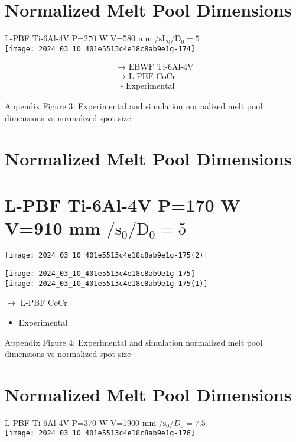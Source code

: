 \documentclass[10pt]{article}
\begin{document}
\section*{Normalized Melt Pool Dimensions}
L-PBF Ti-6Al-4V P=270 W V=580 mm $/ \mathrm{s} \mathrm{L}_{0} / \mathrm{D}_{0}=5$\\
\texttt{[image: 2024\_03\_10\_401e5513c4e18c8ab9e1g-174]}

$$
\begin{aligned}
& \longrightarrow \text { EBWF Ti-6Al-4V } \\
& \longrightarrow \text { L-PBF CoCr } \\
& \text { - Experimental }
\end{aligned}
$$

Appendix Figure 3: Experimental and simulation normalized melt pool dimensions vs normalized spot size

\section*{Normalized Melt Pool Dimensions}
\section*{L-PBF Ti-6Al-4V P=170 W V=910 mm $/ \mathrm{s}_{0} / \mathrm{D}_{0}=5$}
\begin{center}
\texttt{[image: 2024\_03\_10\_401e5513c4e18c8ab9e1g-175(2)]}
\end{center}

\texttt{[image: 2024\_03\_10\_401e5513c4e18c8ab9e1g-175]}\\
\texttt{[image: 2024\_03\_10\_401e5513c4e18c8ab9e1g-175(1)]}

$\rightarrow$ L-PBF CoCr

\begin{itemize}
  \item Experimental
\end{itemize}

Appendix Figure 4: Experimental and simulation normalized melt pool dimensions vs normalized spot size

\section*{Normalized Melt Pool Dimensions}
L-PBF Ti-6Al-4V P=370 W V=1900 mm $/ \mathrm{s}_{0} / D_{0}=7.5$\\
\texttt{[image: 2024\_03\_10\_401e5513c4e18c8ab9e1g-176]}
\end{document}
